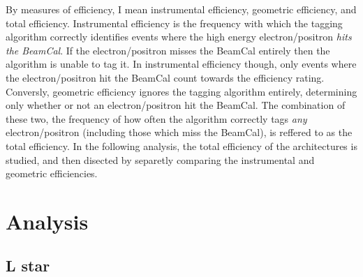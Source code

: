 \documentclass{report}
\begin{document}
                By measures of efficiency, I mean instrumental efficiency, geometric efficiency, and total efficiency. Instrumental efficiency is the frequency with which the tagging algorithm correctly identifies events where the high energy electron/positron \textit{hits the BeamCal}. If the electron/positron misses the BeamCal entirely then the algorithm is unable to tag it. In instrumental efficiency though, only events where the electron/positron hit the BeamCal count towards the efficiency rating. Conversly, geometric efficiency ignores the tagging algorithm entirely, determining only whether or not an electron/positron hit the BeamCal. The combination of these two, the frequency of how often the algorithm correctly tags \textit{any} electron/positron (including those which miss the BeamCal), is reffered to as the total efficiency. In the following analysis, the total efficiency of the architectures is studied, and then disected by separetly comparing the instrumental and geometric efficiencies.





    \chapter{Analysis}
        \section{L star}
\end{document}
